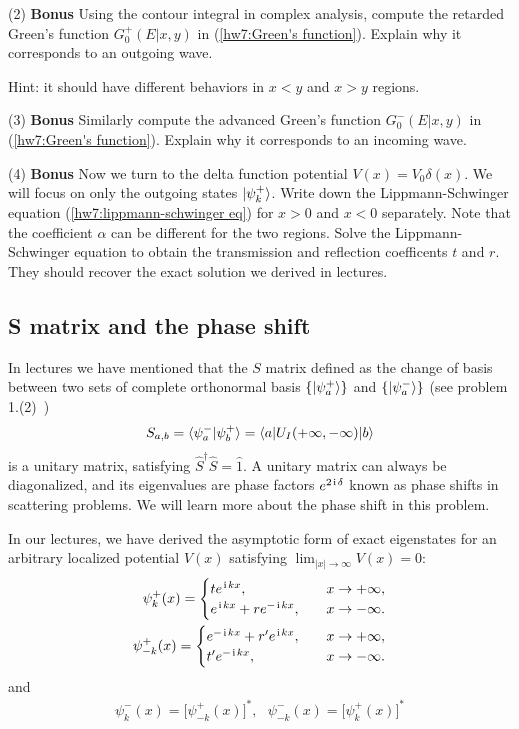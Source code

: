 (2) \textbf{Bonus} Using the contour integral in complex analysis, compute the retarded Green's function $G_0^+(E|x,y)$ in (\ref{hw7:Green's function}). Explain why it corresponds to an outgoing wave. 

Hint: it should have different behaviors in $x<y$ and $x>y$ regions. 

(3) \textbf{Bonus} Similarly compute the advanced Green's function $G_0^-(E|x,y)$ in (\ref{hw7:Green's function}). Explain why it corresponds to an incoming wave. 

(4) \textbf{Bonus} Now we turn to the delta function potential $V(x)=V_0\delta(x)$. We will focus on only the outgoing states $|{\psi^+_k}\rangle$. Write down the Lippmann-Schwinger equation (\ref{hw7:lippmann-schwinger eq}) for $x>0$ and $x<0$ separately. Note that the coefficient $\alpha$ can be different for the two regions. Solve the Lippmann-Schwinger equation to obtain the transmission and reflection coefficents $t$ and $r$. They should recover the exact solution we derived in lectures. 

\subsection{S matrix and the phase shift}

In lectures we have mentioned that the $S$ matrix defined as the change of basis between two sets of complete orthonormal basis $\{|{\psi^+_a}\rangle\}$ and $\{|{\psi_a^-}\rangle\}$ (see problem 1.(2)~)
\begin{align}
S_{a,b}=\langle{\psi_a^-|\psi_b^+}\rangle=\langle{a|U_I(+\infty,-\infty)|b}\rangle
\end{align}
is a unitary matrix, satisfying $\hat S^\dagger\hat S=\hat 1$. A unitary matrix can always be diagonalized, and its eigenvalues are phase factors $e^{2\hspace{1pt}\mathrm{i}\hspace{1pt}\delta}$ known as phase shifts in scattering problems. We will learn more about the phase shift in this problem. 

In our lectures, we have derived the asymptotic form of exact eigenstates for an arbitrary localized potential $V(x)$ satisfying $\lim_{|x|\rightarrow\infty}V(x)=0$:
\begin{align}
\psi^+_k(x)=\begin{cases}
    t e^{\hspace{1pt}\mathrm{i}\hspace{1pt} kx},~~~&x\rightarrow+\infty,\\
    e^{\hspace{1pt}\mathrm{i}\hspace{1pt} kx}+re^{-\hspace{1pt}\mathrm{i}\hspace{1pt} kx},~~~&x\rightarrow-\infty.
\end{cases}\\
\psi^+_{-k}(x)=\begin{cases}
    e^{-\hspace{1pt}\mathrm{i}\hspace{1pt} kx}+r^\prime e^{\hspace{1pt}\mathrm{i}\hspace{1pt} kx},~~~&x\rightarrow+\infty,\\
    t^\prime e^{-\hspace{1pt}\mathrm{i}\hspace{1pt} kx},~~~&x\rightarrow-\infty.
\end{cases}
\end{align}
and 
\begin{align}
\psi^-_k(x)=\big[\psi^+_{-k}(x)\big]^\ast,~~~\psi^-_{-k}(x)=\big[\psi^+_{k}(x)\big]^\ast
\end{align}

